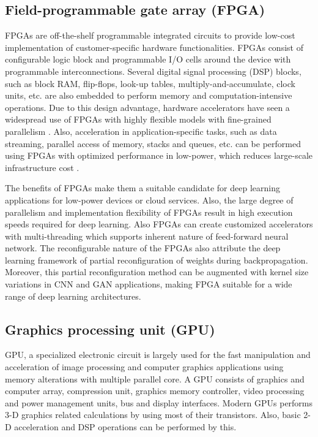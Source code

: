 \documentclass[journal]{IEEEtran}
\begin{document}
\subsection{Field-programmable gate array (FPGA)}
FPGAs are off-the-shelf programmable integrated circuits to provide low-cost implementation of customer-specific hardware functionalities. FPGAs consist of configurable logic block and programmable I/O cells around the device with programmable interconnections. Several digital signal processing (DSP) blocks, such as block RAM, flip-flops, look-up tables, multiply-and-accumulate, clock units, etc. are also embedded to perform memory and computation-intensive operations. Due to this design advantage, hardware accelerators have seen a widespread use of FPGAs with highly flexible models with fine-grained parallelism \cite{fpga1}. Also, acceleration in application-specific tasks, such as data streaming, parallel access of memory, stacks and queues, etc. can be performed using FPGAs with optimized performance in low-power, which reduces large-scale infrastructure cost \cite{fpga2,fpga3}. 

\par The benefits of FPGAs make them a suitable candidate for deep learning applications for low-power devices or cloud services. Also, the large degree of parallelism and implementation flexibility of FPGAs result in high execution speeds required for deep learning. Also FPGAs can create customized accelerators with multi-threading which supports inherent nature of feed-forward neural network. The reconfigurable nature of the FPGAs also attribute the deep learning framework of partial reconfiguration of weights during backpropagation. Moreover, this partial reconfiguration method can be augmented with kernel size variations in CNN and GAN applications, making FPGA suitable for a wide range of deep learning architectures.

\subsection{Graphics processing unit (GPU)}
GPU, a specialized electronic circuit is largely used for the fast manipulation and acceleration of image processing and computer graphics applications using memory alterations with multiple parallel core. A GPU consists of graphics and computer array, compression unit, graphics memory controller, video processing and power management units, bus and display interfaces. Modern GPUs performs 3-D graphics related calculations by using most of their transistors. Also, basic 2-D acceleration and DSP operations can be performed by this. 
\end{document}
